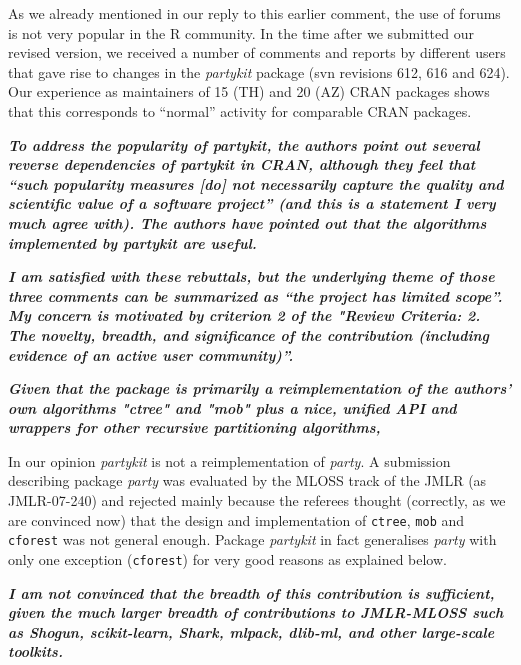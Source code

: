 \documentclass{article}
\begin{document}
\smallskip

As we already mentioned in our reply to this earlier comment, the use of forums
is not very popular in the R community. In the time after we submitted our
revised version, we received a number of comments and reports by different
users that gave rise to changes in the \emph{partykit} package (svn
revisions 612, 616 and 624). Our experience as maintainers of 15 (TH) and 20
(AZ) CRAN packages shows that this corresponds to ``normal'' activity for
comparable CRAN packages.

\smallskip

\textbf{\textit{%
To address the popularity of partykit, the
authors point out several reverse dependencies of partykit in CRAN, although
they feel that ``such popularity measures [do] not necessarily capture the
quality and scientific value of a software project'' (and this is a statement
I very much agree with).  The authors have pointed out that the algorithms
implemented by partykit are useful.}}

\textbf{\textit{%
I am satisfied with these rebuttals, but the underlying theme of those three
comments can be summarized as ``the project has limited scope''.  My concern
is motivated by criterion 2 of the "Review Criteria: 2. The novelty, breadth, and significance of the contribution (including
evidence of an active user community)''.}}

\textbf{\textit{%
Given that the package is primarily a reimplementation of the authors' own
algorithms "ctree" and "mob" plus a nice, unified API and wrappers for other
recursive partitioning algorithms,}}

\smallskip

In our opinion \emph{partykit} is not a reimplementation of \emph{party}.
A submission describing package \emph{party} was evaluated by the MLOSS
track of the JMLR (as JMLR-07-240) and rejected mainly because the referees
thought (correctly, as we are convinced now) that the design and
implementation of \texttt{ctree}, \texttt{mob} and \texttt{cforest} was not general
enough. Package \emph{partykit} in fact generalises \emph{party} with only one exception
(\texttt{cforest}) for very good reasons as explained below.

\smallskip

\textbf{\textit{%
I am not convinced that the breadth of
this contribution is sufficient, given the much larger breadth of
contributions to JMLR-MLOSS such as Shogun, scikit-learn, Shark, mlpack,
dlib-ml, and other large-scale toolkits.}}
\end{document}
